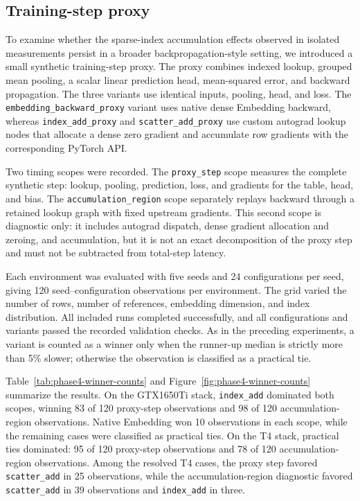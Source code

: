 \subsection{Training-step proxy}
\label{sec:phase4-training-proxy}

To examine whether the sparse-index accumulation effects observed in isolated
measurements persist in a broader backpropagation-style setting, we introduced a
small synthetic training-step proxy. The proxy combines indexed lookup, grouped
mean pooling, a scalar linear prediction head, mean-squared error, and backward
propagation. The three variants use identical inputs, pooling, head, and loss.
The \texttt{embedding\_backward\_proxy} variant uses native dense Embedding
backward, whereas \texttt{index\_add\_proxy} and
\texttt{scatter\_add\_proxy} use custom autograd lookup nodes that allocate a
dense zero gradient and accumulate row gradients with the corresponding PyTorch
API.

Two timing scopes were recorded. The \texttt{proxy\_step} scope measures the
complete synthetic step: lookup, pooling, prediction, loss, and gradients for the
table, head, and bias. The \texttt{accumulation\_region} scope separately replays
backward through a retained lookup graph with fixed upstream gradients. This
second scope is diagnostic only: it includes autograd dispatch, dense gradient
allocation and zeroing, and accumulation, but it is not an exact decomposition of
the proxy step and must not be subtracted from total-step latency.

Each environment was evaluated with five seeds and 24 configurations per seed,
giving 120 seed--configuration observations per environment. The grid varied the
number of rows, number of references, embedding dimension, and index
distribution. All included runs completed successfully, and all configurations
and variants passed the recorded validation checks. As in the preceding
experiments, a variant is counted as a winner only when the runner-up median is
strictly more than 5\% slower; otherwise the observation is classified as a
practical tie.

Table~\ref{tab:phase4-winner-counts} and
Figure~\ref{fig:phase4-winner-counts} summarize the results. On the GTX1650Ti stack, \texttt{index\_add} dominated both scopes, winning 83 of 120
proxy-step observations and 98 of 120 accumulation-region observations. Native
Embedding won 10 observations in each scope, while the remaining cases were
classified as practical ties. On the T4 stack, practical ties dominated: 95 of
120 proxy-step observations and 78 of 120 accumulation-region observations. Among
the resolved T4 cases, the proxy step favored \texttt{scatter\_add} in 25
observations, while the accumulation-region diagnostic favored
\texttt{scatter\_add} in 39 observations and \texttt{index\_add} in three.

